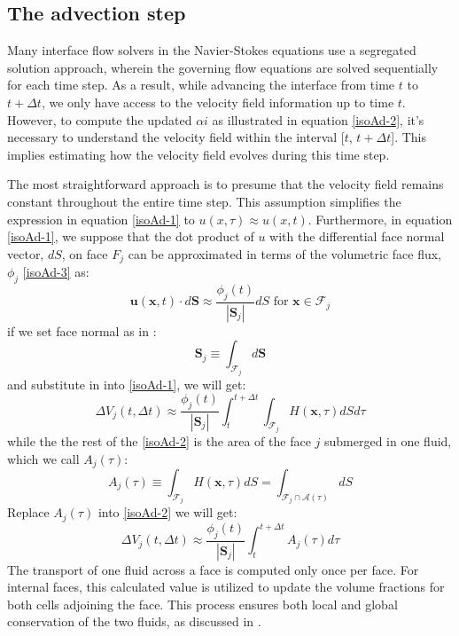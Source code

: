 \subsection{The advection step}
Many interface flow solvers in the Navier-Stokes equations use a segregated solution approach, wherein the governing flow equations are solved sequentially for each time step. As a result, while advancing the interface from time $t$ to $t + \Delta t$, we only have access to the velocity field information up to time $t$. However, to compute the updated $\alpha i$ as illustrated in equation \ref{isoAd-2}, it's necessary to understand the velocity field within the interval [$t$, $t + \Delta t$]. This implies estimating how the velocity field evolves during this time step.

The most straightforward approach is to presume that the velocity field remains constant throughout the entire time step. This assumption simplifies the expression in equation \ref{isoAd-1} to $u(x, \tau) \approx u(x, t)$. Furthermore, in equation \ref{isoAd-1}, we suppose that the dot product of $u$ with the differential face normal vector, $dS$, on face $F_j$ can be approximated in terms of the volumetric face flux, $\phi_j$  \ref{isoAd-3} as:
\begin{equation}
\mathbf{u}(\mathbf{x}, t) \cdot d \mathbf{S} \approx \frac{\phi_{j}(t)}{\left|\mathbf{S}_{j}\right|} d S \text { for } \mathbf{x} \in \mathcal{F}_{j}
\end{equation}
if we set face normal as in \cite{roenby2019isoadvector}:
\begin{equation}
\mathbf{S}_{j} \equiv \int_{\mathcal{F}_{j}} d \mathbf{S}
\end{equation}
and substitute in into \ref{isoAd-1}, we will get:
\begin{equation}\label{isoAd-2}
\Delta V_{j}(t, \Delta t) \approx \frac{\phi_{j}(t)}{\left|\mathbf{S}_{j}\right|} \int_{t}^{t+\Delta t} \int_{\mathcal{F}_{j}} H(\mathbf{x}, \tau) d S d \tau
\end{equation}
while the the rest of the \ref{isoAd-2} is the area of the face $j$ submerged in one fluid, which we call $A_{j}(\tau)$:
\begin{equation}
A_{j}(\tau) \equiv \int_{\mathcal{F}_{j}} H(\mathbf{x}, \tau) d S=\int_{\mathcal{F}_{j} \cap \mathcal{A}(\tau)} d S
\end{equation}
Replace $A_{j}(\tau)$ into \ref{isoAd-2} we will get:
\begin{equation}
\Delta V_{j}(t, \Delta t) \approx \frac{\phi_{j}(t)}{\left|\mathbf{S}_{j}\right|} \int_{t}^{t+\Delta t} A_{j}(\tau) d \tau
\end{equation}
The transport of one fluid across a face is computed only once per face. For internal faces, this calculated value is utilized to update the volume fractions for both cells adjoining the face. This process ensures both local and global conservation of the two fluids, as discussed in \cite{roenby2019isoadvector}.
